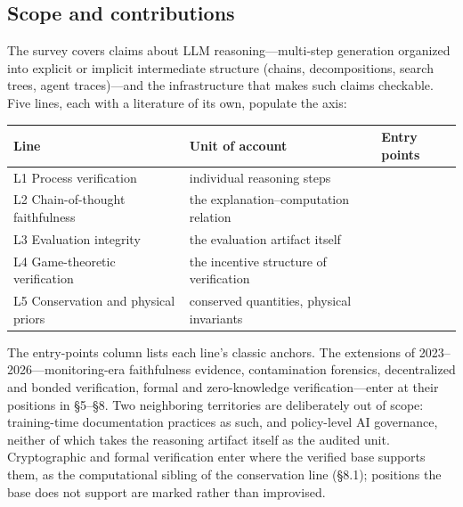 \documentclass[11pt,a4paper]{article}
\begin{document}
\subsection{Scope and contributions}

The survey covers claims about LLM reasoning—multi-step generation organized into explicit or implicit intermediate structure (chains, decompositions, search trees, agent traces)—and the infrastructure that makes such claims checkable. Five lines, each with a literature of its own, populate the axis:

\begin{table}[htbp]
\centering
\small
\setlength{\tabcolsep}{3.5pt}
\renewcommand{\arraystretch}{1.18}
\begin{tabularx}{0.985\textwidth}{>{\raggedright\arraybackslash}p{} >{\raggedright\arraybackslash}X >{\raggedright\arraybackslash}p{}}
\toprule
\textbf{Line} & \textbf{Unit of account} & \textbf{Entry points} \\
\midrule
L1 Process verification & individual reasoning steps & \cite{key05,key06} \\
L2 Chain-of-thought faithfulness & the explanation–computation relation & \cite{key02,key03} \\
L3 Evaluation integrity & the evaluation artifact itself & \cite{key07,key08} \\
L4 Game-theoretic verification & the incentive structure of verification & \cite{key09,key10} \\
L5 Conservation and physical priors & conserved quantities, physical invariants & \cite{key11,key12,key13} \\
\bottomrule
\end{tabularx}
\end{table}

The entry-points column lists each line's classic anchors. The extensions of 2023–2026—monitoring-era faithfulness evidence, contamination forensics, decentralized and bonded verification, formal and zero-knowledge verification—enter at their positions in §5–§8. Two neighboring territories are deliberately out of scope: training-time documentation practices as such, and policy-level AI governance, neither of which takes the reasoning artifact itself as the audited unit. Cryptographic and formal verification enter where the verified base supports them, as the computational sibling of the conservation line (§8.1); positions the base does not support are marked rather than improvised.
\end{document}
